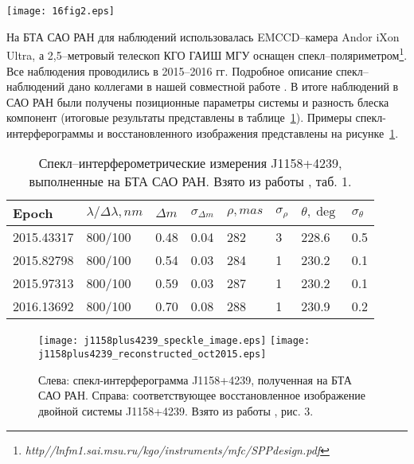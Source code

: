 \begin{figure*}
\centering
\texttt{[image: 16fig2.eps]}
\caption{Движение фотоцентра системы J1158+4239 по данным фотографических и цифровых обзоров неба (1955 "--- POSS1, 1984 "--- GSC1, 1990 и 1991 "--- POSS2, 1996 "--- GSC2, 2003 "--- SDSS, 2012 "--- пулковские наблюдения). Линия характеризует среднее движение фотоцентра.  Взято из работы \cite{2016AstL...42..686K}, рис. 2.}
\label{fig:J1158+4258_motion}
\end{figure*}
На БТА САО РАН для наблюдений использовалась  EMCCD--камера Andor iXon Ultra, а 2,5--метровый телескоп КГО ГАИШ МГУ оснащен спекл--поляриметром\footnote{\textit{http//lnfm1.sai.msu.ru/kgo/instruments/mfc/SPPdesign.pdf}}. Все наблюдения проводились в 2015--2016 гг.  Подробное описание спекл--наблюдений дано коллегами в нашей совместной работе \cite{2016AstL...42..686K}. В итоге наблюдений в САО РАН были получены позиционные параметры системы и разность блеска компонент (итоговые результаты представлены в таблице~\ref{tab:SI_meas}).  Примеры спекл-интерферограммы и восстановленного изображения представлены на рисунке~\ref{fig:sao_spekle_image}.

\begin{table}[p]
\centering
\caption{Спекл--интерферометрические измерения J1158+4239, выполненные на БТА САО РАН. Взято из работы \cite{2016AstL...42..686K}, таб. 1.}
\label{tab:SI_meas}
\bigskip
\begin{tabularx}{\textwidth}{l|l|ll|ll|ll}
Epoch      & $\lambda /\Delta \lambda, nm$ & $\Delta m$ & $\sigma _{\Delta m}$ & $\rho, mas$ & $\sigma _\rho$ & $\theta, \deg $& $\sigma_\theta$ \\
\hline
2015.43317 & 800/100 & 0.48 & 0.04 & 282 & 3  & 228.6 & 0.5               \\
2015.82798 & 800/100 & 0.54 & 0.03 & 284 & 1  & 230.2 & 0.1               \\
2015.97313 & 800/100 & 0.59 & 0.03 & 287 & 1  & 230.2 & 0.1               \\
2016.13692 & 800/100 & 0.70 & 0.08 & 288 & 1  & 230.9 & 0.2               \\
\hline
\end{tabularx}
\end{table}

\begin{figure}
\centering
\texttt{[image: j1158plus4239\_speckle\_image.eps]}
\texttt{[image: j1158plus4239\_reconstructed\_oct2015.eps]}
\caption{Слева: спекл-интерферограмма J1158+4239, полученная на БТА САО РАН. Справа: соответствующее восстановленное изображение двойной системы J1158+4239. Взято из работы \cite{2016AstL...42..686K}, рис. 3.}
\label{fig:sao_spekle_image}
\end{figure}

